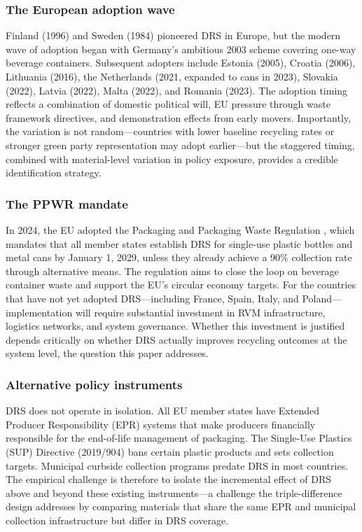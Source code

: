 \documentclass[12pt]{article}
\begin{document}
\subsubsection*{The European adoption wave} Finland (1996) and Sweden (1984) pioneered DRS in Europe, but the modern wave of adoption began with Germany's ambitious 2003 scheme covering one-way beverage containers. Subsequent adopters include Estonia (2005), Croatia (2006), Lithuania (2016), the Netherlands (2021, expanded to cans in 2023), Slovakia (2022), Latvia (2022), Malta (2022), and Romania (2023). The adoption timing reflects a combination of domestic political will, EU pressure through waste framework directives, and demonstration effects from early movers. Importantly, the variation is not random---countries with lower baseline recycling rates or stronger green party representation may adopt earlier---but the staggered timing, combined with material-level variation in policy exposure, provides a credible identification strategy.

\subsubsection*{The PPWR mandate} In 2024, the EU adopted the Packaging and Packaging Waste Regulation \citep{euPPWR2024}, which mandates that all member states establish DRS for single-use plastic bottles and metal cans by January 1, 2029, unless they already achieve a 90\% collection rate through alternative means. The regulation aims to close the loop on beverage container waste and support the EU's circular economy targets. For the countries that have not yet adopted DRS---including France, Spain, Italy, and Poland---implementation will require substantial investment in RVM infrastructure, logistics networks, and system governance. Whether this investment is justified depends critically on whether DRS actually improves recycling outcomes at the system level, the question this paper addresses.

\subsubsection*{Alternative policy instruments} DRS does not operate in isolation. All EU member states have Extended Producer Responsibility (EPR) systems that make producers financially responsible for the end-of-life management of packaging. The Single-Use Plastics (SUP) Directive (2019/904) bans certain plastic products and sets collection targets. Municipal curbside collection programs predate DRS in most countries. The empirical challenge is therefore to isolate the incremental effect of DRS above and beyond these existing instruments---a challenge the triple-difference design addresses by comparing materials that share the same EPR and municipal collection infrastructure but differ in DRS coverage.
\end{document}
